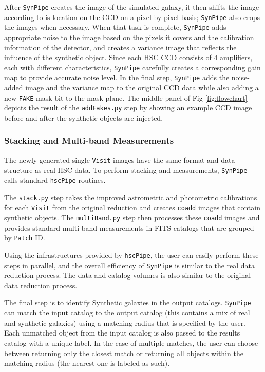 \documentclass[useamsfonts]{pasj01}
\def\hscpipe{\texttt{hscPipe}}
\def\synpipe{\texttt{SynPipe}}
\def\coadd{\texttt{coadd}}
\def\visit{\texttt{Visit}}
\begin{document}
    After \synpipe{} creates the image of the simulated galaxy, it then shifts the
    image according to is location on the CCD on a pixel-by-pixel basis;
    \synpipe{} also crops the images when necessary.
    When that task is complete, \synpipe{} adds appropriate noise to the image based
    on the pixels it covers and the calibration information of the detector, and creates
    a variance image that reflects the influence of the synthetic object.
    Since each HSC CCD consists of 4 amplifiers, each with different characteristics,
    \synpipe{} carefully creates a corresponding gain map to provide accurate noise
    level.
    In the final step, \synpipe{} adds the noise-added image and the variance map to the
    original CCD data while also adding a new \texttt{FAKE} mask bit to the mask plane.
    The middle panel of Fig \ref{fig:flowchart} depicts the result of the
    \texttt{addFakes.py} step by showing an example CCD image before and after the
    synthetic objects are injected.

\subsubsection{Stacking and Multi-band Measurements}
    \label{sssec:multiband}

    The newly generated single-\visit{} images have the same format and data
    structure as real HSC data. To perform stacking and measurements, \synpipe{} calls standard \hscpipe{} routines.
    
    The \texttt{stack.py} step takes the improved astrometric and photometric
    calibrations for each \visit{} from the original reduction and creates
    \coadd{}  images that contain synthetic objects.
    The \texttt{multiBand.py} step then processes these \coadd{}  images and
    provides standard multi-band measurements in FITS catalogs that are grouped by
    \texttt{Patch} ID.

    Using the infrastructures provided by \hscpipe{}, the user can easily perform these steps in parallel, and the overall efficiency of \synpipe{} is similar to
    the real data reduction process. The data and catalog volumes is also similar to the original data reduction process.

 The final step is to identify Synthetic galaxies in the output catalogs. \synpipe{} can match the input catalog to the output catalog (this contains a mix of real and synthetic galaxies) using a matching radius that is specified by the user.
    Each unmatched object from the input catalog is also passed to the results catalog
    with a unique label.
    In the case of multiple matches, the user can choose between returning only the
    closest match or returning all objects within the matching radius (the nearest one
    is labeled as such).
\end{document}

